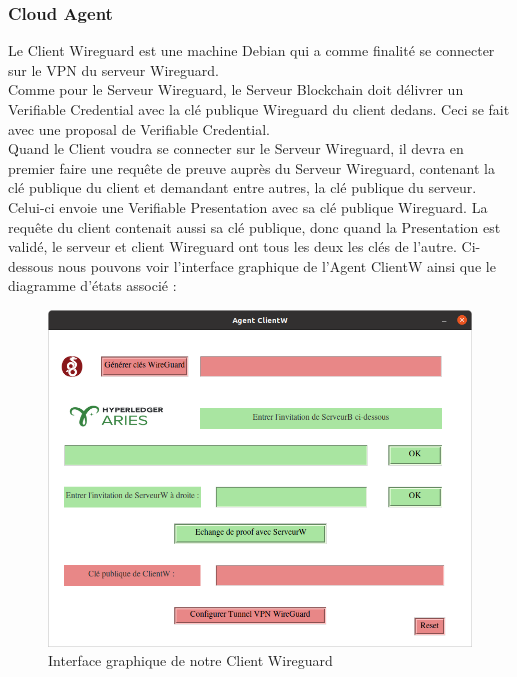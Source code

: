 \documentclass[12pt, openany]{report}
\begin{document}
\subsubsection{Cloud Agent}
\noindent 
\begin{flushleft}
Le Client Wireguard est une machine Debian qui a comme finalité se connecter sur le VPN du serveur Wireguard. \\
Comme pour le Serveur Wireguard, le Serveur Blockchain doit délivrer un Verifiable Credential avec la clé publique Wireguard du client dedans. Ceci se fait avec une proposal de Verifiable Credential. \\
Quand le Client voudra se connecter sur le Serveur Wireguard, il devra en premier faire une requête de preuve auprès du Serveur Wireguard, contenant la clé publique du client et demandant entre autres, la clé publique du serveur. Celui-ci envoie une Verifiable Presentation avec sa clé publique Wireguard. La requête du client contenait aussi sa clé publique, donc quand la Presentation est validé, le serveur et client Wireguard ont tous les deux les clés de l'autre.
Ci-dessous nous pouvons voir l'interface graphique de l'Agent ClientW ainsi que le diagramme d'états associé :
\begin{figure}[H]
\includegraphics[scale=0.5]{clientW.png}
\centering
\caption{Interface graphique de notre Client Wireguard}
\end{figure}


\end{flushleft}
\end{document}
